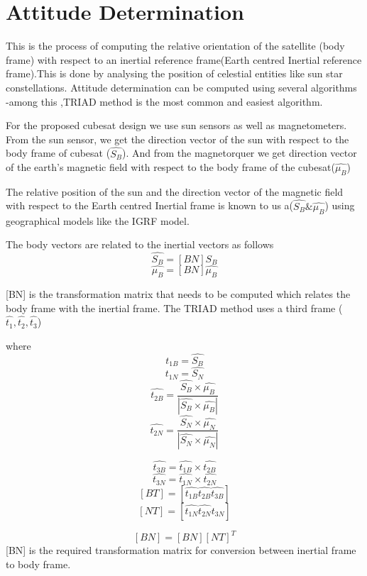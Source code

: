 \chapter{Attitude Determination}

This is the process of computing the relative orientation of the satellite (body frame) with respect to an inertial reference frame(Earth centred Inertial reference frame).This is  done by analysing the position of celestial entities like sun  star constellations. Attitude determination can be computed using several algorithms -among this ,TRIAD method is the most common and easiest algorithm.

\vspace{5pt} 

For the proposed cubesat design we use sun sensors as well as magnetometers.
From the sun sensor, we get the direction vector of the sun with respect to the body frame of cubesat ($\hat{S_B}$). And from the magnetorquer we get direction vector of the earth’s magnetic field with respect to the body frame of the cubesat($\hat{\mu_B}$)

\vspace{5pt}

The relative position of the sun and the direction vector of the magnetic field with respect to the Earth centred Inertial frame is known to us a($\hat{S_B} \& \hat{\mu_B}$) using geographical models like the IGRF model.

\vspace{5pt}

The body vectors are related to the inertial vectors as follows
$$ \hat{S_B} = [BN]\hat{S_B} $$
$$ \hat{\mu_B} = [BN]\hat{\mu_B} $$

\vspace{15pt}

[BN] is the transformation matrix that needs to be computed which relates the body frame with the inertial frame. The TRIAD method uses a third frame ($\hat{t_1},\hat{t_2},\hat{t_3}$)

where $$t_{1B} = \hat{S_B}$$
$$  t_{1N} = \hat{S_N}$$
$$\hat{t_{2B}} = \frac{\hat{S_B}\times\hat{\mu_B}}{|\hat{S_B}\times\hat{\mu_B}|}$$
$$\hat{t_{2N}} = \frac{\hat{S_N}\times\hat{\mu_N}}{|\hat{S_N}\times\hat{\mu_N}|}$$

 $$\hat{t_{3B}} = \hat{t_{1B}} \times \hat{t_{2B}}$$
 $$\hat{t_{3N}} = \hat{t_{1N}} \times \hat{t_{2N}}$$
 $$[BT] = [\hat{t_{1B}} \hat{t_{2B}} \hat{t_{3B}} ]$$
 $$[NT] = [\hat{t_{1N}} \hat{t_{2N}} \hat{t_{3N}} ]$$
 
 $$[BN] = [BN][NT]^T$$
[BN] is the required transformation matrix for conversion between inertial frame to body frame.
